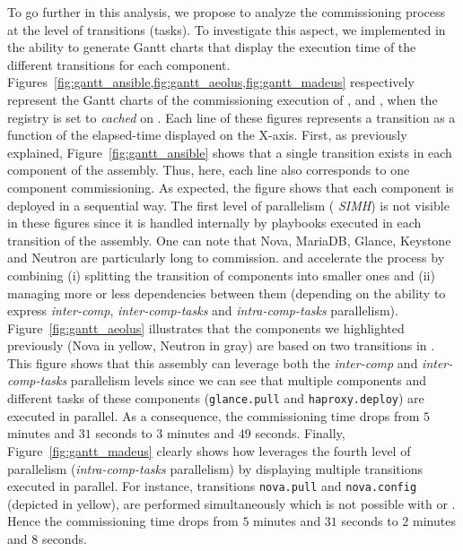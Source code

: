 To go further in this analysis, we propose to analyze the
commissioning process at the level of transitions (\ie tasks). To
investigate this aspect, we implemented in \mad the ability to
generate Gantt charts that display the execution time of the different
transitions for each component.
Figures~\ref{fig:gantt_ansible,fig:gantt_aeolus,fig:gantt_madeus}
respectively represent the Gantt charts of the commissioning execution
of \ansass, \aeoass and \madass, when the registry is set to
\emph{cached} on \ecotype. Each line of these figures represents a
transition as a function of the elapsed-time displayed on the X-axis.
First, as previously explained, Figure~\ref{fig:gantt_ansible} shows that a
single transition exists in each component of the \ansass
assembly. Thus, here, each line also corresponds to one component
commissioning. As expected, the figure shows that each component is
deployed in a sequential way. The first level of parallelism (\ie
\emph{SIMH}) is not visible in these figures since it is handled
internally by \ansible playbooks executed in each transition of the
assembly. One can note that Nova, MariaDB, Glance, Keystone and
Neutron are particularly long to commission. \aeoass and \madass
accelerate the process by combining (i) splitting the transition of
components into smaller ones and (ii) managing more or less
dependencies between them (depending on the ability to express
\emph{inter-comp}, \emph{inter-comp-tasks} and \emph{intra-comp-tasks}
parallelism).
%
Figure~\ref{fig:gantt_aeolus} illustrates that the components we
highlighted previously (\eg Nova in yellow, Neutron in gray) are based
on two transitions in \aeoass. This figure shows that this assembly
can leverage both the \emph{inter-comp} and \emph{inter-comp-tasks}
parallelism levels since we can see that multiple components and
different tasks of these components (\eg \texttt{glance.pull} and
\texttt{haproxy.deploy}) are executed in parallel. As a consequence,
the commissioning time drops from $5$ minutes and $31$ seconds to $3$
minutes and $49$ seconds.
%
Finally, Figure~\ref{fig:gantt_madeus} clearly shows how \mad
leverages the fourth level of parallelism (\ie \emph{intra-comp-tasks}
parallelism) by displaying multiple transitions executed in
parallel. For instance, transitions \texttt{nova.pull} and
\texttt{nova.config} (depicted in yellow), are performed
simultaneously which is not possible with \ansible or \aeolus. Hence
the commissioning time drops from $5$ minutes and $31$ seconds to $2$
minutes and $8$ seconds.
%


